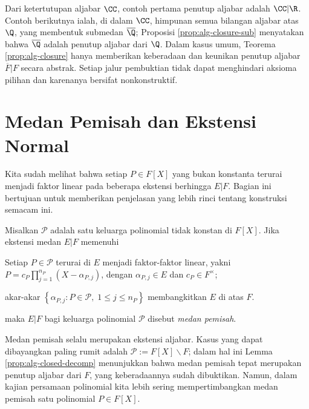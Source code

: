 Dari ketertutupan aljabar $\CC$, contoh pertama penutup aljabar adalah $\CC|\R$. Contoh berikutnya ialah, di dalam $\CC$, himpunan semua bilangan aljabar atas $\Q$, yang membentuk submedan $\overline{\Q}$; Proposisi \ref{prop:alg-closure-sub} menyatakan bahwa $\overline{\Q}$ adalah penutup aljabar dari $\Q$. Dalam kasus umum, Teorema \ref{prop:alg-closure} hanya memberikan keberadaan dan keunikan penutup aljabar $\overline{F}|F$ secara abstrak. Setiap jalur pembuktian tidak dapat menghindari aksioma pilihan dan karenanya bersifat nonkonstruktif.

\section{Medan Pemisah dan Ekstensi Normal}\label{sec:splitting-field}
Kita sudah melihat bahwa setiap $P \in F[X]$ yang bukan konstanta terurai menjadi faktor linear pada beberapa ekstensi berhingga $E|F$. Bagian ini bertujuan untuk memberikan penjelasan yang lebih rinci tentang konstruksi semacam ini.

\begin{definition}
	Misalkan $\mathcal{P}$ adalah satu keluarga polinomial tidak konstan di $F[X]$. Jika ekstensi medan $E|F$ memenuhi
	\begin{compactitem}
		\item Setiap $P \in \mathcal{P}$ terurai di $E$ menjadi faktor-faktor linear, yakni $P = c_P \prod_{j=1}^{n_P}(X - \alpha_{P,j})$, dengan $\alpha_{P,j} \in E$ dan $c_P \in F^\times$;
		\item akar-akar $\left\{ \alpha_{P,j} : P \in \mathcal{P},\; 1 \leq j \leq n_P \right\}$ membangkitkan $E$ di atas $F$.
	\end{compactitem}
	maka $E|F$ bagi keluarga polinomial $\mathcal{P}$ disebut \emph{medan pemisah}.
\end{definition}
Medan pemisah selalu merupakan ekstensi aljabar. Kasus yang dapat dibayangkan paling rumit adalah $\mathcal{P} := F[X] \smallsetminus F$; dalam hal ini Lemma \ref{prop:alg-closed-decomp} menunjukkan bahwa medan pemisah tepat merupakan penutup aljabar dari $F$, yang keberadaannya sudah dibuktikan. Namun, dalam kajian persamaan polinomial kita lebih sering mempertimbangkan medan pemisah satu polinomial $P \in F[X]$.

